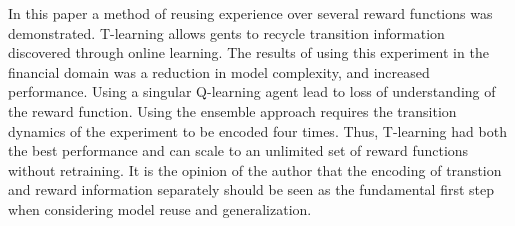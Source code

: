 In this paper a method of reusing experience over several reward functions was demonstrated. T-learning allows gents to recycle transition information discovered through online learning. The results of using this experiment in the financial domain was a reduction in model complexity, and increased performance. Using a singular Q-learning agent lead to loss of understanding of the reward function.  Using the ensemble approach requires the transition dynamics of the experiment to be encoded four times. Thus, T-learning had both the best performance and can scale to an unlimited set of reward functions without retraining. It is the opinion of the author that the encoding of transtion and reward information separately should be seen as the fundamental first step when considering model reuse and generalization.  